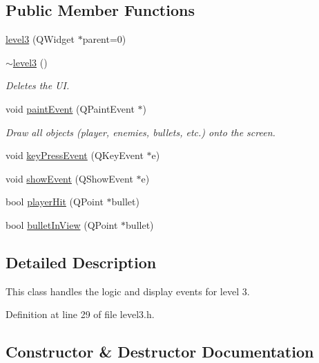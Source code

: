 \subsection*{Public Member Functions}
\begin{DoxyCompactItemize}
\item 
\hyperlink{classlevel3_afebe2c45163d990af866acd09009b04c}{level3} (Q\+Widget $\ast$parent=0)
\item 
\hyperlink{classlevel3_a169943ab9e00ed9d5c27d0f82db41f21}{$\sim$level3} ()\hypertarget{classlevel3_a169943ab9e00ed9d5c27d0f82db41f21}{}\label{classlevel3_a169943ab9e00ed9d5c27d0f82db41f21}

\begin{DoxyCompactList}\small\item\em Deletes the UI. \end{DoxyCompactList}\item 
void \hyperlink{classlevel3_a4d86feae84476160378ba337b2c6f307}{paint\+Event} (Q\+Paint\+Event $\ast$)\hypertarget{classlevel3_a4d86feae84476160378ba337b2c6f307}{}\label{classlevel3_a4d86feae84476160378ba337b2c6f307}

\begin{DoxyCompactList}\small\item\em Draw all objects (player, enemies, bullets, etc.) onto the screen. \end{DoxyCompactList}\item 
void \hyperlink{classlevel3_acbe6512013ed239e731b30724a6aa7cd}{key\+Press\+Event} (Q\+Key\+Event $\ast$e)
\item 
void \hyperlink{classlevel3_ac048e17317e98ef9266401a8ad665585}{show\+Event} (Q\+Show\+Event $\ast$e)
\item 
bool \hyperlink{classlevel3_a0096b5dc26768d318bc7c1cf27b6344c}{player\+Hit} (Q\+Point $\ast$bullet)
\item 
bool \hyperlink{classlevel3_a9d0fba300db611002691fea00f926bd5}{bullet\+In\+View} (Q\+Point $\ast$bullet)
\end{DoxyCompactItemize}


\subsection{Detailed Description}
This class handles the logic and display events for level 3. 

Definition at line 29 of file level3.\+h.



\subsection{Constructor \& Destructor Documentation}
